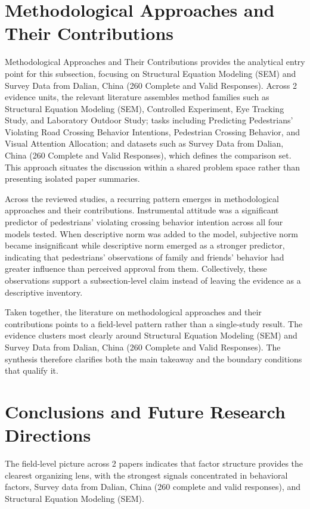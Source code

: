 \documentclass{article}
\begin{document}
\section{Methodological Approaches and Their Contributions}
Methodological Approaches and Their Contributions provides the analytical entry point for this subsection, focusing on Structural Equation Modeling (SEM) and Survey Data from Dalian, China (260 Complete and Valid Responses). Across 2 evidence units, the relevant literature assembles method families such as Structural Equation Modeling (SEM), Controlled Experiment, Eye Tracking Study, and Laboratory Outdoor Study; tasks including Predicting Pedestrians' Violating Road Crossing Behavior Intentions, Pedestrian Crossing Behavior, and Visual Attention Allocation; and datasets such as Survey Data from Dalian, China (260 Complete and Valid Responses), which defines the comparison set. This approach situates the discussion within a shared problem space rather than presenting isolated paper summaries. \cite{08_2016_zhou_aap,09_2018_jiang_aap}

Across the reviewed studies, a recurring pattern emerges in methodological approaches and their contributions. Instrumental attitude was a significant predictor of pedestrians' violating crossing behavior intention across all four models tested. When descriptive norm was added to the model, subjective norm became insignificant while descriptive norm emerged as a stronger predictor, indicating that pedestrians' observations of family and friends' behavior had greater influence than perceived approval from them. Collectively, these observations support a subsection-level claim instead of leaving the evidence as a descriptive inventory. \cite{08_2016_zhou_aap,09_2018_jiang_aap}

Taken together, the literature on methodological approaches and their contributions points to a field-level pattern rather than a single-study result. The evidence clusters most clearly around Structural Equation Modeling (SEM) and Survey Data from Dalian, China (260 Complete and Valid Responses). The synthesis therefore clarifies both the main takeaway and the boundary conditions that qualify it. \cite{08_2016_zhou_aap,09_2018_jiang_aap}

\section{Conclusions and Future Research Directions}
The field-level picture across 2 papers indicates that factor structure provides the clearest organizing lens, with the strongest signals concentrated in behavioral factors, Survey data from Dalian, China (260 complete and valid responses), and Structural Equation Modeling (SEM). \cite{08_2016_zhou_aap,09_2018_jiang_aap}
\end{document}
